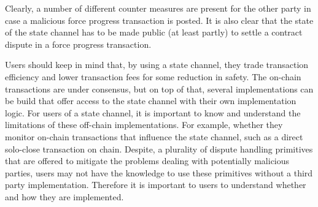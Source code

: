 Clearly, a number of different counter
measures are present for the other party in case a malicious force
progress transaction is posted. It is also clear that the state of the
state channel has to be made public (at least partly) to settle a
contract dispute in a force progress transaction.

Users should keep in mind that, by using a state channel, they trade
transaction efficiency and lower transaction fees for some reduction in
safety.
The on-chain transactions are under consensus, but on top of that,
several implementations can be build that offer access to the state
channel with their own implementation logic. For users of a state
channel, it is important to know and understand the limitations of
these off-chain implementations. For example, whether they monitor
on-chain transactions that influence the state channel, such as a
direct solo-close transaction on chain.
Despite, a plurality of dispute handling primitives that are offered to
mitigate the problems dealing with potentially malicious parties,
users may not have the knowledge to use these primitives without a
third party implementation. Therefore it is important to users to understand
whether and how they are implemented.
